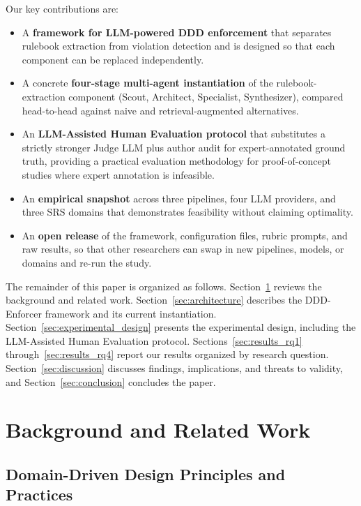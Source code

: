 \documentclass[smallextended]{svjour3}
\begin{document}
Our key contributions are:
\begin{itemize}
    \item A \textbf{framework for LLM-powered DDD enforcement} that separates rulebook extraction from violation detection and is designed so that each component can be replaced independently.
    \item A concrete \textbf{four-stage multi-agent instantiation} of the rulebook-extraction component (Scout, Architect, Specialist, Synthesizer), compared head-to-head against naive and retrieval-augmented alternatives.
    \item An \textbf{LLM-Assisted Human Evaluation protocol} that substitutes a strictly stronger Judge LLM plus author audit for expert-annotated ground truth, providing a practical evaluation methodology for proof-of-concept studies where expert annotation is infeasible.
    \item An \textbf{empirical snapshot} across three pipelines, four LLM providers, and three SRS domains that demonstrates feasibility without claiming optimality.
    \item An \textbf{open release} of the framework, configuration files, rubric prompts, and raw results, so that other researchers can swap in new pipelines, models, or domains and re-run the study.
\end{itemize}

The remainder of this paper is organized as follows.
Section~\ref{sec:background} reviews the background and related work.
Section~\ref{sec:architecture} describes the DDD-Enforcer framework and its current instantiation.
Section~\ref{sec:experimental_design} presents the experimental design, including the LLM-Assisted Human Evaluation protocol.
Sections~\ref{sec:results_rq1} through~\ref{sec:results_rq4} report our results organized by research question.
Section~\ref{sec:discussion} discusses findings, implications, and threats to validity, and
Section~\ref{sec:conclusion} concludes the paper.


\section{Background and Related Work}
\label{sec:background}

\subsection{Domain-Driven Design Principles and Practices}
\label{sec:bg_ddd}
\end{document}

